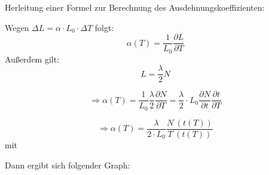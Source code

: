 Herleitung einer Formel zur Berechnung des Ausdehnungskoeffizienten:

Wegen $ \Delta L = \alpha \cdot L_{0} \cdot \Delta T $ folgt: 
\\
\begin{equation}
\alpha (T) = \frac{1}{L_{0}} \frac{\partial L}{\partial T}
\end{equation}
Außerdem gilt: 
\begin{equation}
L = \frac{\lambda}{2} N
\end{equation}

\begin{equation}
\Rightarrow \alpha(T) = \frac{1}{L_{0}} \frac{\lambda}{2} \frac{\partial N}{\partial T} = \frac{\lambda}{2} \cdot L_{0} \frac{\partial N}{\partial t} \frac{\partial t}{\partial T}
\end{equation}

\begin{equation}
\Rightarrow \alpha (T) = \frac{\lambda}{2 \cdot L_{0}} \frac{N^{\cdot}(t(T))}{T^{\cdot}(t(T))}
\end{equation} 
mit 

Dann ergibt sich folgender Graph:

